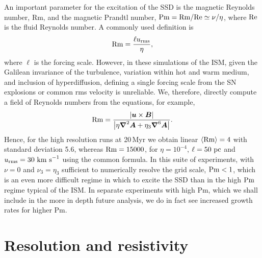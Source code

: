 \documentclass[preprint2]{aastex63}
\newcommand\Rm{{\rm Rm} }
\newcommand\Rey{{\rm Re} }
\newcommand\Pm{{\rm Pm} }
\newcommand{\vect}[1]{{{\mbox{\boldmath $#1$}}}}%
\newcommand\pc{~ {\rm pc}}
\newcommand\kms{~ {\rm km~ s}^{-1}}
\begin{document}
An important 
parameter for the excitation of the SSD
is the magnetic Reynolds number, Rm,
and the magnetic Prandtl number, $\Pm = \Rm/\Rey \simeq \nu/\eta$, where $\Rey$
is the fluid Reynolds number.
A commonly used definition is \[\Rm=\frac{\ell u_{\rm rms}}{\eta},\] where
$\ell$ is the forcing scale.
However, in these simulations of the ISM, given the 
Galilean invariance of the 
turbulence, variation within hot and warm medium, and inclusion of
hyperdiffusion, defining a single forcing scale from the SN explosions or 
common rms velocity is unreliable.
We, therefore, directly compute a field of Reynolds numbers from the equations,
for example,
\begin{eqnarray}
  \Rm = \frac{\left|\vect{u}\times\vect{B}\right|}{
    \left|\eta\vect\nabla^2\vect{A}+\eta_3\vect\nabla^6\vect{A}\right|}.
\end{eqnarray}
Hence, for the high resolution runs at 20\,Myr we obtain linear
$\langle\Rm\rangle=4$ with standard deviation 5.6, whereas 
$\Rm = 15000$, for $\eta=10^{-4}$, $\ell=50\pc$ and $u_{\rm rms}=30\kms$ using
the common formula.
In this suite of experiments, with $\nu=0$ and $\nu_3=\eta_3$ sufficient to
numerically resolve the grid scale, $\Pm<1$, which is an even more difficult
regime in which to excite the SSD than in the high $\Pm$
regime typical of the ISM.
In separate experiments with high Pm, which we shall include in the more in
depth future analysis, we do in fact see increased growth rates for higher
Pm.

\section{Resolution and resistivity} \label{sec:results}
\end{document}

